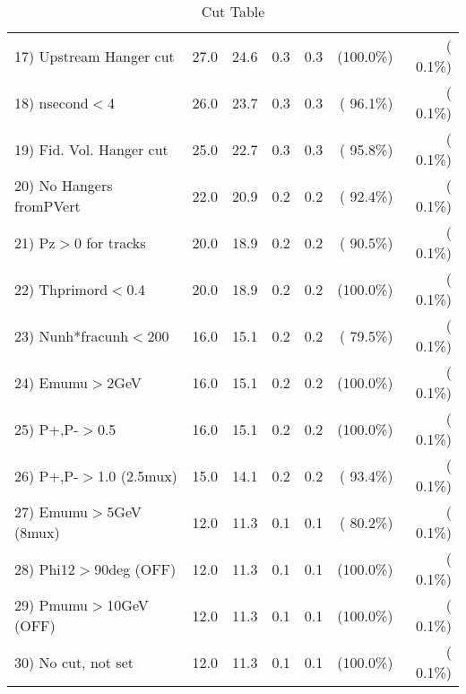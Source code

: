\begin{table}[h!]
\begin{tabular}{||l||r|r|r|r|r|r||}
 17) Upstream Hanger cut  &         27.0 &         24.6 &          0.3 &          0.3 & (100.0\%) & (  0.1\%) \\
 18) nsecond$<$4          &         26.0 &         23.7 &          0.3 &          0.3 & ( 96.1\%) & (  0.1\%) \\
 19) Fid. Vol. Hanger cut &         25.0 &         22.7 &          0.3 &          0.3 & ( 95.8\%) & (  0.1\%) \\
 20) No Hangers fromPVert &         22.0 &         20.9 &          0.2 &          0.2 & ( 92.4\%) & (  0.1\%) \\
 21) Pz$>$0 for tracks    &         20.0 &         18.9 &          0.2 &          0.2 & ( 90.5\%) & (  0.1\%) \\
 22) Thprimord$<$0.4      &         20.0 &         18.9 &          0.2 &          0.2 & (100.0\%) & (  0.1\%) \\
 23) Nunh*fracunh$<$200   &         16.0 &         15.1 &          0.2 &          0.2 & ( 79.5\%) & (  0.1\%) \\
 24) Emumu$>$2GeV         &         16.0 &         15.1 &          0.2 &          0.2 & (100.0\%) & (  0.1\%) \\
 25) P+,P-$>$0.5          &         16.0 &         15.1 &          0.2 &          0.2 & (100.0\%) & (  0.1\%) \\
 26) P+,P-$>$1.0 (2.5mux) &         15.0 &         14.1 &          0.2 &          0.2 & ( 93.4\%) & (  0.1\%) \\
 27) Emumu$>$5GeV  (8mux) &         12.0 &         11.3 &          0.1 &          0.1 & ( 80.2\%) & (  0.1\%) \\
 28) Phi12$>$90deg  (OFF) &         12.0 &         11.3 &          0.1 &          0.1 & (100.0\%) & (  0.1\%) \\
 29) Pmumu$>$10GeV  (OFF) &         12.0 &         11.3 &          0.1 &          0.1 & (100.0\%) & (  0.1\%) \\
 30) No cut, not set      &         12.0 &         11.3 &          0.1 &          0.1 & (100.0\%) & (  0.1\%) \\
 \hline
 \hline
 \end{tabular}
 \caption{Cut Table           }
 \label{tab-cutcohjpsi-mumu_anuecc}
 \end{table}
